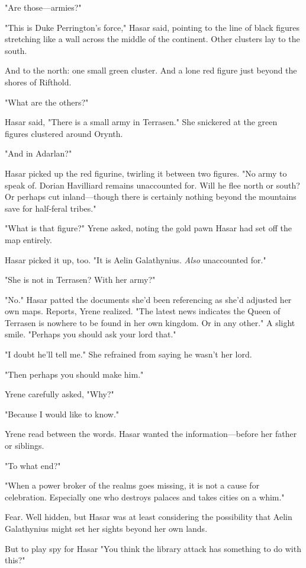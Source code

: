 "Are those---armies?"

"This is Duke Perrington's force," Hasar said, pointing to the line of black figures stretching like a wall across the middle of the continent. Other clusters lay to the south.

And to the north: one small green cluster. And a lone red figure just beyond the shores of Rifthold.

"What are the others?"

Hasar said, "There is a small army in Terrasen." She snickered at the green figures clustered around Orynth.

"And in Adarlan?"

Hasar picked up the red figurine, twirling it between two figures. "No army to speak of. Dorian Havilliard remains unaccounted for. Will he flee north or south? Or perhaps cut inland---though there is certainly nothing beyond the mountains save for half-feral tribes."

"What is that figure?" Yrene asked, noting the gold pawn Hasar had set off the map entirely.

Hasar picked it up, too. "It is Aelin Galathynius. \emph{Also}
unaccounted for."

"She is not in Terrasen? With her army?"

"No." Hasar patted the documents she'd been referencing as she'd adjusted her own maps. Reports, Yrene realized. "The latest news indicates the Queen of Terrasen is nowhere to be found in her own kingdom. Or in any other." A slight smile. "Perhaps you should ask your lord that."

"I doubt he'll tell me." She refrained from saying he wasn't her lord.

"Then perhaps you should make him."

Yrene carefully asked, "Why?"

"Because I would like to know."

Yrene read between the words. Hasar wanted the information---before her father or siblings.

"To what end?"

"When a power broker of the realms goes missing, it is not a cause for celebration. Especially one who destroys palaces and takes cities on a whim."

Fear. Well hidden, but Hasar was at least considering the possibility that Aelin Galathynius might set her sights beyond her own lands.

But to play spy for Hasar  "You think the library attack has something to do with this?"

